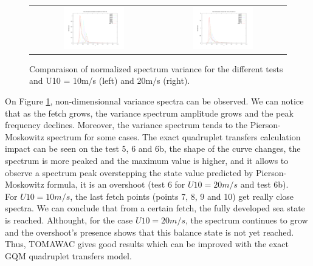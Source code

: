 \begin{figure}[h!]
\begin{tabular}{cc}
\includegraphics[width=0.5\textwidth]{variance_ad_free_mesh_t6b_v10.pdf} & \includegraphics[width=0.5\textwidth]{variance_ad_free_mesh_t6b_v20.pdf}\\
\end{tabular}
\caption{Comparaison of normalized spectrum variance for the different tests and U10 = 10m/s (left) and 20m/s (right).}
\label{variancesfet}
\end{figure}
On Figure \ref{variancesfet}, non-dimensionnal variance spectra can be observed. We can notice that as the fetch grows, the variance spectrum amplitude grows and the peak frequency declines. Moreover, the variance spectrum tends to the Pierson-Moskowitz spectrum for some cases. The exact quadruplet transfers calculation impact can be seen on the test 5, 6 and 6b, the shape of the curve changes, the spectrum is more peaked and the maximum value is higher, and it allows to observe a spectrum peak overstepping the state value predicted by Pierson-Moskowitz formula, it is an overshoot (test 6 for $U10 = 20m/s$ and test 6b).\\
For $U10 = 10m/s$, the last fetch points (points 7, 8, 9 and 10) get really close spectra. We can conclude that from a certain fetch, the fully developed sea state is reached. Althought, for the case $U10 = 20m/s$, the spectrum continues to grow and the overshoot's presence shows that this balance state is not yet reached. Thus, TOMAWAC gives good results which can be improved with the exact GQM quadruplet transfers model.

